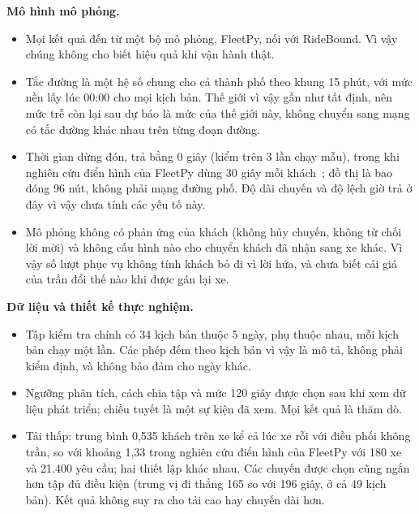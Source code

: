 \textbf{Mô hình mô phỏng.}
\begin{itemize}[leftmargin=1.2cm,itemsep=2pt,topsep=3pt]
\item Mọi kết quả đến từ một bộ mô phỏng, FleetPy, nối với RideBound. Vì vậy chúng không cho biết hiệu quả khi vận
hành thật.
\item Tắc đường là một hệ số chung cho cả thành phố theo khung 15 phút, với mức nền lấy lúc 00:00 cho mọi kịch bản.
Thế giới vì vậy gần như tất định, nên mức trễ còn lại sau dự báo là mức của thế giới này, không chuyển sang mạng có
tắc đường khác nhau trên từng đoạn đường.
\item Thời gian dừng đón, trả bằng 0 giây (kiểm trên 3 lần chạy mẫu), trong khi nghiên cứu điển hình của FleetPy dùng
30 giây mỗi khách~\cite{engelhardt2026}; đồ thị là bao đóng 96 nút, không phải mạng đường phố. Độ dài chuyến và độ
lệch giờ trả ở đây vì vậy chưa tính các yếu tố này.
\item Mô phỏng không có phản ứng của khách (không hủy chuyến, không từ chối lời mời) và không cấu hình nào cho chuyển
khách đã nhận sang xe khác. Vì vậy số lượt phục vụ không tính khách bỏ đi vì lời hứa, và chưa biết cái giá của trần
đổi thế nào khi được gán lại xe.
\end{itemize}

\textbf{Dữ liệu và thiết kế thực nghiệm.}
\begin{itemize}[leftmargin=1.2cm,itemsep=2pt,topsep=3pt]
\item Tập kiểm tra chính có 34 kịch bản thuộc 5 ngày, phụ thuộc nhau, mỗi kịch bản chạy một lần. Các phép đếm theo
kịch bản vì vậy là mô tả, không phải kiểm định, và không bảo đảm cho ngày khác.
\item Ngưỡng phân tích, cách chia tập và mức 120 giây được chọn sau khi xem dữ liệu phát triển; chiều tuyết là một
sự kiện đã xem. Mọi kết quả là thăm dò.
\item Tải thấp: trung bình 0,535 khách trên xe kể cả lúc xe rỗi với điều phối không trần, so với khoảng 1,33 trong
nghiên cứu điển hình của FleetPy với 180 xe và 21.400 yêu cầu; hai thiết lập khác nhau. Các chuyến được chọn cũng
ngắn hơn tập đủ điều kiện (trung vị đi thẳng 165 so với 196 giây, ở cả 49 kịch bản). Kết quả không suy ra cho tải
cao hay chuyến dài hơn.
\end{itemize}

